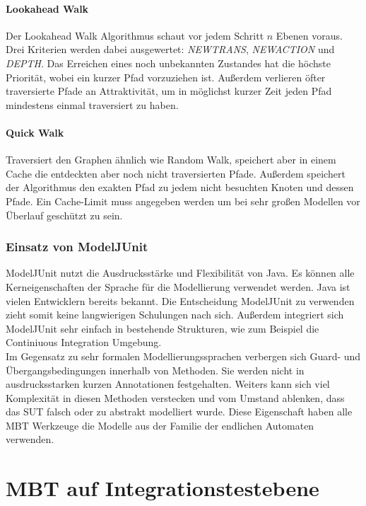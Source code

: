 \paragraph{Lookahead Walk}
Der Lookahead Walk Algorithmus schaut vor jedem Schritt $n$ Ebenen voraus. Drei Kriterien werden dabei ausgewertet: \textit{NEWTRANS}, \textit{NEWACTION} und \textit{DEPTH}. Das Erreichen eines noch unbekannten Zustandes hat die höchste Priorität, wobei ein kurzer Pfad vorzuziehen ist. Außerdem verlieren öfter traversierte Pfade an Attraktivität, um in möglichst kurzer Zeit jeden Pfad mindestens einmal traversiert zu haben.

\paragraph{Quick Walk}
Traversiert den Graphen ähnlich wie Random Walk, speichert aber in einem Cache die entdeckten aber noch nicht traversierten Pfade. Außerdem speichert der Algorithmus den exakten Pfad zu jedem nicht besuchten Knoten und dessen Pfade. Ein Cache-Limit muss angegeben werden um bei sehr großen Modellen vor Überlauf geschützt zu sein.

\subsubsection{Einsatz von ModelJUnit}
ModelJUnit nutzt die Ausdrucksstärke und Flexibilität von Java. Es können alle Kerneigenschaften der Sprache für die Modellierung verwendet werden. Java ist vielen Entwicklern bereits bekannt. Die Entscheidung ModelJUnit zu verwenden zieht somit keine langwierigen Schulungen nach sich. Außerdem integriert sich ModelJUnit sehr einfach in bestehende Strukturen, wie zum Beispiel die Continiuous Integration Umgebung.\\
Im Gegensatz zu sehr formalen Modellierungssprachen verbergen sich Guard- und Übergangsbedingungen innerhalb von Methoden. Sie werden nicht in ausdrucksstarken kurzen Annotationen festgehalten. Weiters kann sich viel Komplexität in diesen Methoden verstecken und vom Umstand ablenken, dass das \Gls{SUT} falsch oder zu abstrakt modelliert wurde. Diese Eigenschaft haben alle \Gls{MBT} Werkzeuge die Modelle aus der Familie der endlichen Automaten verwenden.

\section{MBT auf Integrationstestebene}
\label{sec:mbt_integration}

